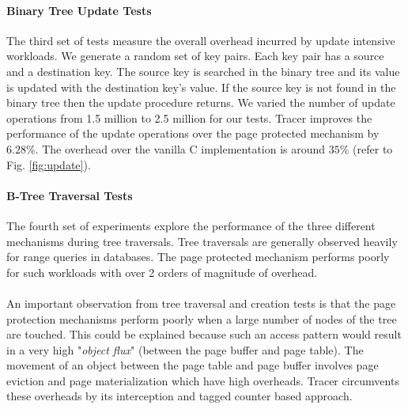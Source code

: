 \paragraph{Binary Tree Update Tests}
The third set of tests measure the overall overhead incurred by update intensive workloads. We generate a random set of key pairs. Each key pair has a source and a destination key. The source key is searched in the binary tree and its value is updated with the destination key's value. If the source key is not found in the binary tree then the update procedure returns. We varied the number of update operations from 1.5 million to 2.5 million for our tests. Tracer improves the performance of the update operations over the page protected mechanism by $6.28\%$. The overhead over the vanilla C implementation is around $35\%$ (refer to Fig. \ref{fig:update}). 

\paragraph{B-Tree Traversal Tests}
The fourth set of experiments explore the performance of the three different mechanisms during tree traversals. Tree traversals are generally observed heavily for range queries in databases. The page protected mechanism performs poorly for such workloads with over 2 orders of magnitude of overhead. 

\paragraph{}
An important observation from tree traversal and creation tests is that the page protection mechanisms perform poorly when a large number of nodes of the tree are touched. This could be explained because such an access pattern would result in a very high "{\emph{object flux}}" (between the page buffer and page table). The movement of an object between the page table and page buffer involves page eviction and page materialization which have high overheads. Tracer circumvents these overheads by its interception and tagged counter based approach. 
